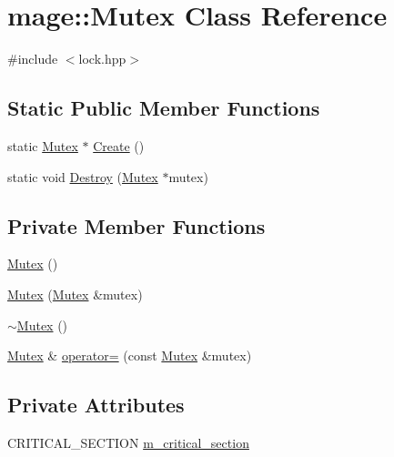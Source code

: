 \hypertarget{classmage_1_1_mutex}{}\section{mage\+:\+:Mutex Class Reference}
\label{classmage_1_1_mutex}


{\ttfamily \#include $<$lock.\+hpp$>$}

\subsection*{Static Public Member Functions}
\begin{DoxyCompactItemize}
\item 
static \hyperlink{classmage_1_1_mutex}{Mutex} $\ast$ \hyperlink{classmage_1_1_mutex_a48d784fa6bffd4088d9f89a2a9cca84e}{Create} ()
\item 
static void \hyperlink{classmage_1_1_mutex_a78cd1aff434b1d7cefce4c8339c25d8f}{Destroy} (\hyperlink{classmage_1_1_mutex}{Mutex} $\ast$mutex)
\end{DoxyCompactItemize}
\subsection*{Private Member Functions}
\begin{DoxyCompactItemize}
\item 
\hyperlink{classmage_1_1_mutex_ab22db01311271ef54642b10ea53dfd8a}{Mutex} ()
\item 
\hyperlink{classmage_1_1_mutex_a0f38f170668eb1fe3c2f110738edc39e}{Mutex} (\hyperlink{classmage_1_1_mutex}{Mutex} \&mutex)
\item 
\hyperlink{classmage_1_1_mutex_a143d82ec7bb43f953a1703caa7972e9d}{$\sim$\+Mutex} ()
\item 
\hyperlink{classmage_1_1_mutex}{Mutex} \& \hyperlink{classmage_1_1_mutex_aeaab2190729234e0da465ed0196111f0}{operator=} (const \hyperlink{classmage_1_1_mutex}{Mutex} \&mutex)
\end{DoxyCompactItemize}
\subsection*{Private Attributes}
\begin{DoxyCompactItemize}
\item 
C\+R\+I\+T\+I\+C\+A\+L\+\_\+\+S\+E\+C\+T\+I\+ON \hyperlink{classmage_1_1_mutex_a18414337aef28b7ed261e7a805d2c103}{m\+\_\+critical\+\_\+section}
\end{DoxyCompactItemize}
